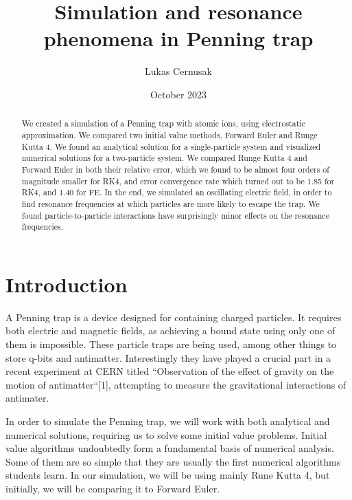 \documentclass[english,notitlepage,reprint,nofootinbib]{revtex4-1}
\begin{document}


\title{Simulation and resonance phenomena in Penning trap}  %
\author{Lukas Cernusak} %
\date{October 2023}                             %
\noaffiliation                            %

\begin{abstract}
We created a simulation of a Penning trap with atomic ions, using electrostatic approximation. We compared two initial value methods, Forward Euler and Runge Kutta 4. We found an analytical solution for a single-particle system and visualized numerical solutions for a two-particle system. We compared Runge Kutta 4 and Forward Euler in both their relative error, which we found to be almost four orders of magnitude smaller for RK4, and error convergence rate which turned out to be 1.85 for RK4, and 1.40 for FE. In the end, we simulated an oscillating electric field, in order to find resonance frequencies at which particles are more likely to escape the trap. We found particle-to-particle interactions have surprisingly minor effects on the resonance frequencies.
    
\end{abstract}
\maketitle


\section{Introduction}


A Penning trap is a device designed for containing charged particles. It requires both electric and magnetic fields, as achieving a bound state using only one of them is impossible. These particle traps are being used, among other things to store q-bits and antimatter. Interestingly they have played a crucial part in a recent experiment at CERN titled ``Observation of the effect of gravity on the motion of antimatter``[1], attempting to measure the gravitational interactions of antimater.

In order to simulate the Penning trap, we will work with both analytical and numerical solutions, requiring us to solve some initial value problems. 
Initial value algorithms undoubtedly form a fundamental basis of numerical analysis. Some of them are so simple that they are usually the first numerical algorithms students learn. In our simulation, we will be using mainly Rune Kutta 4, but initially, we will be comparing it to Forward Euler.
\end{document}
